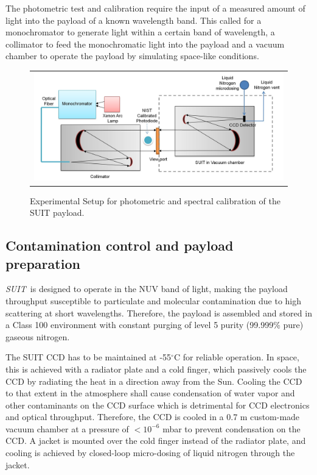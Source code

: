 \documentclass[12pt]{spieman}  %
\newcommand{\suit}{{\it SUIT~}}
\newcommand{\degree}{$^{\circ}$}
\begin{document}
The photometric test and calibration require the input of a measured amount of light into the payload of a known wavelength band. This called for a monochromator to generate light within a certain band of wavelength, a collimator to feed the monochromatic light into the payload and a vacuum chamber to operate the payload by simulating space-like conditions.

\begin{figure}[ht]
\begin{center}
\begin{tabular}{c}
\includegraphics[trim={1cm 0 1.0cm 1.0cm},clip,width=0.9\linewidth]{monochromator.jpg}
\end{tabular}
\end{center}
\caption 
{ \label{fig:experimentalsetup} Experimental Setup for photometric and spectral calibration of the SUIT payload.} 
\end{figure}

\subsection{Contamination control and payload preparation}

\suit is designed to operate in the NUV band of light, making the payload throughput susceptible to particulate and molecular contamination due to high scattering at short wavelengths. Therefore, the payload is assembled and stored in a Class 100 environment with constant purging of level 5 purity (99.999\% pure) gaseous nitrogen.
 
 The SUIT CCD has to be maintained at -55\degree C for reliable operation. In space, this is achieved with a radiator plate and a cold finger, which passively cools the CCD by radiating the heat in a direction away from the Sun. Cooling the CCD to that extent in the atmosphere shall cause condensation of water vapor and other contaminants on the CCD surface which is detrimental for CCD electronics and optical throughput. Therefore, the CCD is cooled in a 0.7 m custom-made vacuum chamber at a pressure of $< 10^{-6}$ mbar to prevent condensation on the CCD.
 A jacket is mounted over the cold finger instead of the radiator plate, and cooling is achieved by closed-loop micro-dosing of liquid nitrogen through the jacket.
\end{document}

